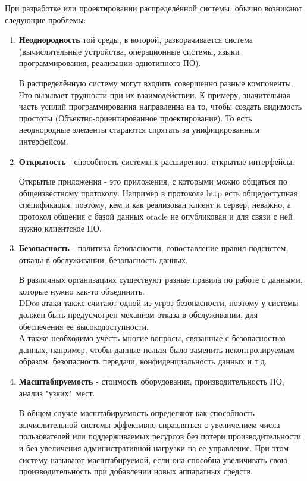 \noindent При разработке или проектировании распределённой системы, обычно возникают следующие проблемы:
\begin{enumerate}
\setlength\itemsep{0.32em}
\item
\textbf{ Неоднородность} той среды, в которой, разворачивается система (вычислительные устройства, операционные системы, языки программирования, реализации однотипного ПО). 

В распределённую систему могут входить совершенно разные компоненты. Что вызывает трудности при их взаимодействии.
К примеру, значительная часть усилий программирования направленна на то, чтобы создать видимость простоты (Объектно-ориентированное проектирование).
То есть неоднородные элементы стараются спрятать за унифицированным интерфейсом.

\item
\textbf{ Открытость} - способность системы к расширению, открытые интерфейсы. 

Открытые приложения - это приложения, с которыми можно общаться по общеизвестному протоколу. Например в протоколе http есть общедоступная спецификация, поэтому, кем и как реализован клиент и сервер, неважно, а протокол общения с базой данных oracle не опубликован и для связи с ней нужно клиентское ПО.

\item
\textbf{ Безопасность} - политика безопасности, сопоставление правил подсистем, отказы в обслуживании, безопасность данных.

В различных организациях существуют разные правила по работе с данными, которые нужно как-то объединить. \\
DDos атаки также считают одной из угроз безопасности, поэтому у системы должен быть предусмотрен механизм отказа в обслуживании, для обеспечения её высокодоступности.\\
А также необходимо учесть многие вопросы, связанные с безопасностью данных, например, чтобы данные нельзя было заменить неконтролируемым образом, безопасность передачи, конфиденциальность данных и т.д.

\item
\textbf{ Масштабируемость} - стоимость оборудования, производительность ПО, анализ "узких"\ мест.

В общем случае масштабируемость определяют как способность вычислительной системы эффективно справляться с увеличением числа пользователей или поддерживаемых ресурсов без потери производительности и без увеличения административной нагрузки на ее управление. При этом систему называют масштабируемой, если она способна увеличивать свою производительность при добавлении новых аппаратных средств.  


\end{enumerate}
